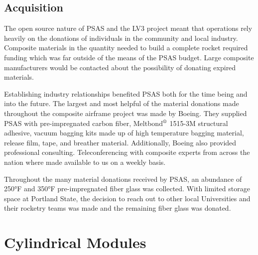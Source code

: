 \documentclass{aiaa-tc}%
\newcommand{\mathregistered}{\text{\textregistered}}
\begin{document}
\subsection{Acquisition}
The open source nature of PSAS and the LV3 project meant that operations rely heavily on the donations of individuals in the community and local industry. Composite materials in the quantity needed to build a complete rocket required funding which was far outside of the means of the PSAS budget. Large composite manufacturers would be contacted about the possibility of donating expired materials.   

Establishing industry relationships benefited PSAS both for the time being and into the future. The largest and most helpful of the material donations made throughout the composite airframe project was made by Boeing. They supplied PSAS with pre-impregnated carbon fiber, Meltbond$^\mathregistered$ 1515-3M structural adhesive, vacuum bagging kits made up of high temperature bagging material, release film, tape, and breather material. Additionally, Boeing also provided professional consulting. Teleconferencing with composite experts from across the nation where made available to us on a weekly basis.  

Throughout the many material donations received by PSAS, an abundance of 250°F and 350°F pre-impregnated fiber glass was collected. With limited storage space at Portland State, the decision to reach out to other local Universities and their rocketry teams was made and the remaining fiber glass was donated. 

\section{Cylindrical Modules}\label{sec:modules}
\end{document}
